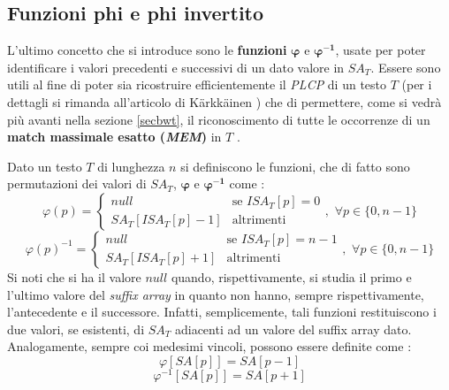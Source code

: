 \subsection{Funzioni phi e phi invertito}
L'ultimo concetto che si introduce sono le \textbf{funzioni}
$\boldsymbol\varphi$ e $\mathbf{\boldsymbol\varphi^{-1}}$, usate per poter
identificare i valori precedenti e successivi di 
un dato valore in $SA_T$. Essere sono utili al fine di poter sia ricostruire
efficientemente il \textit{PLCP} di un testo $T$ (per i dettagli si rimanda
all'articolo di K\"{a}rkk\"{a}inen \cite{plcp}) che di permettere, come si vedrà
più  avanti nella sezione \ref{secbwt}, il riconoscimento di tutte le occorrenze
di un \textbf{match massimale esatto (\textit{MEM})} in $T$ \cite{phoni}.
\begin{definizione}
  Dato un testo $T$ di lunghezza $n$ si definiscono le funzioni, che di fatto
  sono permutazioni dei valori di $SA_T$, $\boldsymbol\varphi$ e
  $\mathbf{\boldsymbol\varphi^{-1}}$ come \cite{phoni}: 
  \[\varphi(p)=
    \begin{cases}
      null&\mbox{se } ISA_T[p]=0\\
      SA_T[ISA_T[p]-1]&\mbox{altrimenti}
    \end{cases},\,\,\forall p\in\{0,n-1\}
  \]
   \[\varphi(p)^{-1}=
    \begin{cases}
      null&\mbox{se } ISA_T[p]=n-1\\
      SA_T[ISA_T[p]+1]&\mbox{altrimenti}
    \end{cases},\,\,\forall p\in\{0,n-1\}
  \]
  Si noti che si ha il valore $null$ quando, rispettivamente, si studia il
  primo e l'ultimo valore del \textit{suffix array} in quanto non hanno, sempre
  rispettivamente, l'antecedente e il successore.   Infatti, semplicemente, tali
  funzioni restituiscono i due valori, se 
  esistenti, di $SA_T$ adiacenti ad un valore del suffix array dato.\\
  Analogamente, sempre coi medesimi vincoli, possono essere definite come
  \cite{plcp}: 
  \[\varphi[SA[p]]=SA[p-1]\]
  \[\varphi^{-1}[SA[p]]=SA[p+1]\]

\end{definizione}
